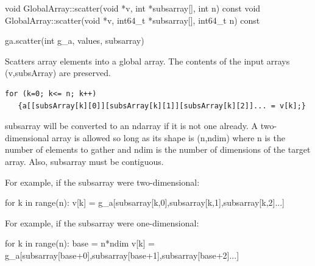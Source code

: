 \documentclass[10pt]{article}
\begin{document}
\begin{cxxapi}
\begin{cxxcode}
void GlobalArray::scatter(void *v, int *subsarray[], int n) const
void GlobalArray::scatter(void *v, int64_t *subsarray[], int64_t n) const
\end{cxxcode}
\begin{funcargs}
\end{funcargs}
\end{cxxapi}

\begin{pyapi}
\begin{pycode}
ga.scatter(int g_a, values, subsarray)
\end{pycode}
\begin{funcargs}
\end{funcargs}
\end{pyapi}

\ncoll

\begin{desc}

Scatters array elements into a global array. The contents of the input arrays
(v,subsArray) are preserved.

\begin{verbatim}
for (k=0; k<= n; k++)
   {a[[subsArray[k][0]][subsArray[k][1]][subsArray[k][2]]... = v[k];}
\end{verbatim}

\end{desc}

\begin{pydesc}

subsarray will be converted to an ndarray if it is not one already.  A
two-dimensional array is allowed so long as its shape is (n,ndim) where n is
the number of elements to gather and ndim is the number of dimensions of the
target array. Also, subsarray must be contiguous.

For example, if the subsarray were two-dimensional:

for k in range(n):
    v[k] = g_a[subsarray[k,0],subsarray[k,1],subsarray[k,2]...]

For example, if the subsarray were one-dimensional:

for k in range(n):
    base = n*ndim
    v[k] = g_a[subsarray[base+0],subsarray[base+1],subsarray[base+2]...]

\end{pydesc}
\end{document}
